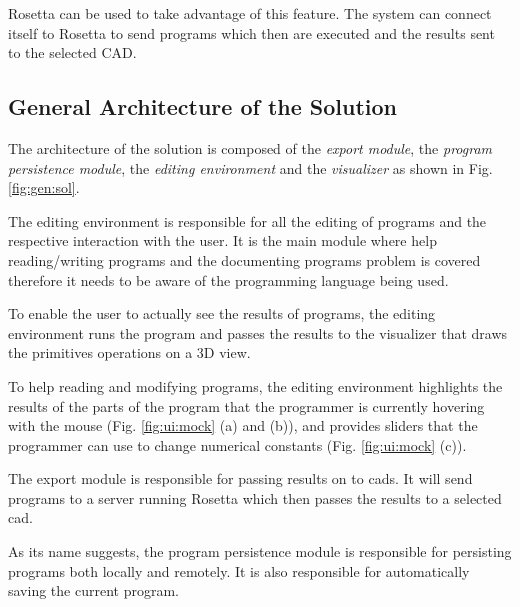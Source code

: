 \documentclass{./llncs2e/llncs}
\begin{document}
	Rosetta can be used to take advantage of this feature.
	The system can connect itself to Rosetta to send programs which then are executed and the results sent to the selected CAD.

\subsection{General Architecture of the Solution}
	
	
	The architecture of the solution is composed of the \emph{export module}, the \emph{program persistence module}, the \emph{editing environment} and the \emph{visualizer} as shown in Fig. \ref{fig:gen:sol}.
	
	The editing environment is responsible for all the editing of programs and the respective interaction with the user.
	It is the main module where help reading/writing programs and the documenting programs problem is covered therefore it needs to be aware of the programming language being used.
	
	To enable the user to actually see the results of programs, the editing environment runs the program and passes the results to the visualizer that draws the primitives operations on a 3D view.
	
	To help reading and modifying programs, the editing environment highlights the results of the parts of the program that the programmer is currently hovering with the mouse (Fig. \ref{fig:ui:mock} (a) and (b)), and  provides sliders that the programmer can use to change numerical constants (Fig. \ref{fig:ui:mock} (c)).
	
	The export module is responsible for passing results on to \acp{cad}.
	It will send programs to a server running Rosetta which then passes the results to a selected \ac{cad}.
	
	As its name suggests, the program persistence module is responsible for persisting programs both locally and remotely.
	It is also responsible for automatically saving the current program.
	
\end{document}
